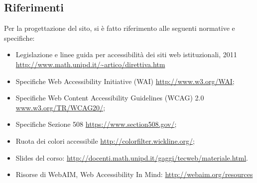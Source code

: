 {    \subsection{Riferimenti}{
		Per la progettazione del sito, si è fatto riferimento alle seguenti normative e specifiche:
		\begin{itemize}\itemsep0.5pt
			\item Legislazione e linee guida per accessibilità dei siti web istituzionali, 2011 \url{http://www.math.unipd.it/~artico/direttiva.htm}
			\item Specifiche Web Accessibility Initiative (WAI)  \url{http://www.w3.org/WAI};
			\item Specifiche Web Content Accessibility Guidelines (WCAG) 2.0 \url{www.w3.org/TR/WCAG20/};
			\item Specifiche Sezione 508 \url{https://www.section508.gov/};
			\item Ruota dei colori accessibile \url{http://colorfilter.wickline.org/};
			\item Slides del corso: \url{http://docenti.math.unipd.it/gaggi/tecweb/materiale.html}.
			\item Risorse di WebAIM, Web Accessibility In Mind: \url{http://webaim.org/resources}
		\end{itemize}
    }
}
